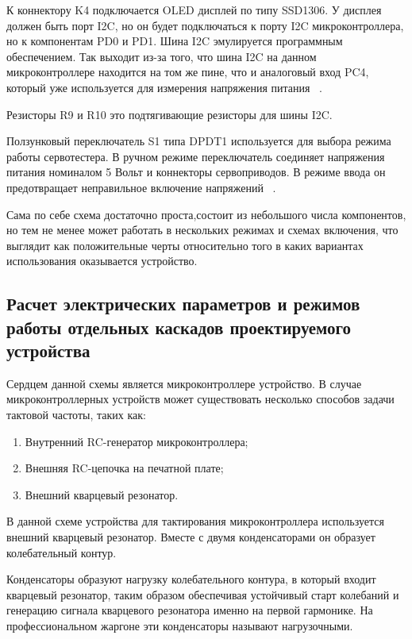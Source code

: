К коннектору K4 подключается OLED дисплей по типу SSD1306.  У
дисплея должен быть порт I2C, но он будет подключаться к
порту I2C микроконтроллера, но к компонентам PD0 и PD1. Шина
I2C эмулируется программным обеспечением. Так выходит из-за
того, что шина I2C на данном микроконтроллере находится на
том же пине, что и аналоговый вход PC4, который уже используется для
измерения напряжения питания ~\cite{Elector521}.

Резисторы R9 и R10 это подтягивающие резисторы для шины I2C.

Ползунковый переключатель S1 типа DPDT1 используется для
выбора режима работы сервотестера. В ручном режиме переключатель
соединяет напряжения питания номиналом 5 Вольт и коннекторы
сервоприводов. В режиме ввода он предотвращает неправильное включение
напряжений ~\cite{Elector521}.

Сама по себе схема достаточно проста,состоит из небольшого числа
компонентов, но тем не менее может работать в нескольких режимах и
схемах включения, что выглядит как положительные черты относительно
того в каких вариантах использования оказывается устройство.

\subsection{Расчет электрических параметров 
  и режимов работы 
  отдельных каскадов проектируемого устройства}


Сердцем данной схемы является микроконтроллере устройство.
В случае микроконтроллерных устройств может существовать несколько
способов задачи тактовой частоты, таких как:
\begin{enumerate}
\item Внутренний RC-генератор микроконтроллера;
\item Внешняя RC-цепочка на печатной плате;  
\item Внешний кварцевый резонатор.
\end{enumerate}

В данной схеме устройства для тактирования микроконтроллера
используется внешний кварцевый резонатор. Вместе с двумя
конденсаторами он образует колебательный контур.

Конденсаторы образуют нагрузку колебательного контура, в который
входит кварцевый резонатор, таким образом обеспечивая устойчивый старт
колебаний и генерацию сигнала кварцевого резонатора именно на первой
гармонике. На профессиональном жаргоне эти конденсаторы называют
нагрузочными.

